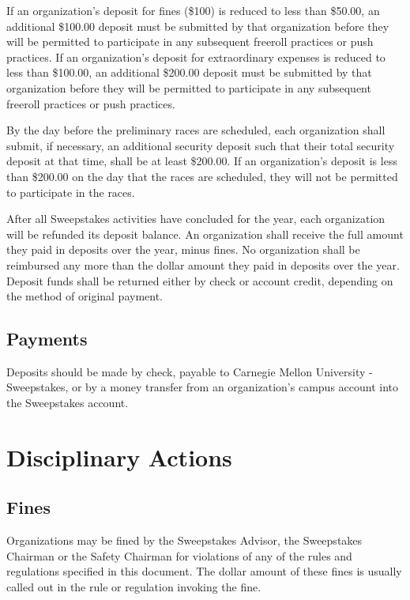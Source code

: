 	If an organization's deposit for fines (\$100) is reduced to less than \$50.00,
	an additional \$100.00 deposit must be submitted by that organization before
	they will be permitted to participate in any subsequent freeroll practices or
	push practices. If an organization's deposit for extraordinary expenses is
	reduced to less than \$100.00, an additional \$200.00 deposit must be submitted
	by that organization before they will be permitted to participate in any
	subsequent freeroll practices or push practices.

	By the day before the preliminary races are scheduled, each organization shall
	submit, if necessary, an additional security deposit such that their total
	security deposit at that time, shall be at least \$200.00. If an organization's
	deposit is less than \$200.00 on the day that the races are scheduled, they
	will not be permitted to participate in the races.

	After all Sweepstakes activities have concluded for the year, each organization
	will be refunded its deposit balance. An organization shall receive the full
	amount they paid in deposits over the year, minus fines. No organization shall
	be reimbursed any more than the dollar amount they paid in deposits over the
	year. Deposit funds shall be returned either by check or account credit, depending
	on the method of original payment.

\subsection{Payments}

	Deposits should be made by check, payable to Carnegie Mellon University -
	Sweepstakes, or by a money transfer from an organization's campus account into
	the Sweepstakes account.

\section{Disciplinary Actions}

\subsection{Fines}

	Organizations may be fined by the Sweepstakes Advisor, the Sweepstakes Chairman
	or the Safety Chairman for violations of any of the rules and regulations
	specified in this document. The dollar amount of these fines is usually called
	out in the rule or regulation invoking the fine.

